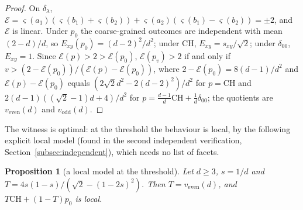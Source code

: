 \documentclass[11pt]{article}
\newtheorem{proposition}[lemma]{Proposition}
\theoremstyle{remark}
\numberwithin{equation}{section}
\newcommand{\cE}{\mathcal{E}}
\newcommand{\veven}{v_{\mathrm{even}}}
\newcommand{\vodd}{v_{\mathrm{odd}}}
\newcommand{\CH}{\mathrm{CH}}
\begin{document}
\begin{proof}
On $\delta_\lambda$, $\cE=\varsigma(a_1)(\varsigma(b_1)+\varsigma(b_2))+\varsigma(a_2)(\varsigma(b_1)-\varsigma(b_2))=\pm2$, and $\cE$ is
linear. Under $p_0$ the coarse-grained outcomes are independent with mean $(2-d)/d$, so $E_{xy}(p_0)=(d-2)^2/d^2$; under
$\CH$, $E_{xy}=s_{xy}/\sqrt2$; under $\delta_{00}$, $E_{xy}=1$. Since $\cE(p)>2>\cE(p_0)$, $\cE(p_v)>2$ if and only if
$v>(2-\cE(p_0))/(\cE(p)-\cE(p_0))$, where $2-\cE(p_0)=8(d-1)/d^2$ and $\cE(p)-\cE(p_0)$ equals $(2\sqrt2d^2-2(d-2)^2)/d^2$
for $p=\CH$ and $2(d-1)((\sqrt2-1)d+4)/d^2$ for $p=\frac{d-1}d\CH+\frac1d\delta_{00}$; the quotients are $\veven(d)$ and
$\vodd(d)$.
\end{proof}

The witness is optimal: at the threshold the behaviour is local, by the following explicit local model (found in the
second independent verification, Section~\ref{subsec:independent}), which needs no list of facets.

\begin{proposition}[a local model at the threshold]\label{prop:flagmodel}
Let $d\ge3$, $s=1/d$ and $T=4s(1-s)/(\sqrt2-(1-2s)^2)$. Then $T=\veven(d)$, and $T\CH+(1-T)p_0$ is local.
\end{proposition}
\end{document}

